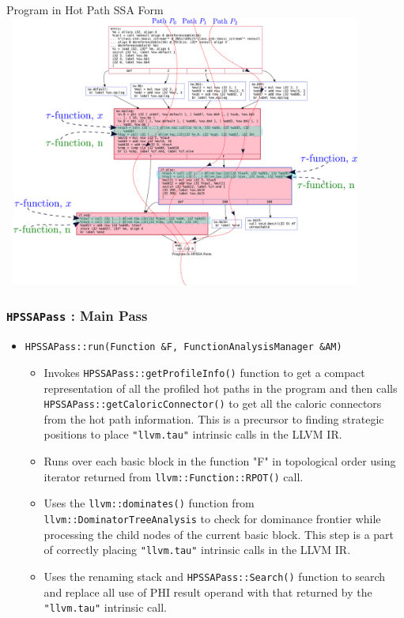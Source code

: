 \documentclass[aspectratio=169, compress]{beamer}
\begin{document}
\begin{frame}{Program in Hot Path SSA Form}
	\centering
	\includegraphics[width=12cm, height=8.95cm]{dotfiles/afterHPSSA.dot.pdf}
\end{frame}

\begin{frame}
	\frametitle{\texttt{HPSSAPass} : Main Pass}
	\begin{itemize}
		\item \texttt{HPSSAPass::run(Function &F, FunctionAnalysisManager &AM)} 
		\begin{itemize}
			\footnotesize
			\item Invokes \texttt{HPSSAPass::getProfileInfo()} function to get a compact representation of all the profiled \color{red} hot paths \color{black} in the program and then calls \texttt{HPSSAPass::getCaloricConnector()} to get all the caloric connectors from the \color{red} hot path \color{black} information. This is a precursor to finding strategic positions to place \texttt{"llvm.tau"} intrinsic calls in the LLVM IR. \pause
			\item Runs over each basic block in the function "F" in topological order using iterator returned from \texttt{llvm::Function::RPOT()} call.
			\item Uses the \texttt{llvm::dominates()} function from \texttt{llvm::DominatorTreeAnalysis} to check for dominance frontier while processing the child nodes of the current basic block. This step is a part of correctly placing \texttt{"llvm.tau"} intrinsic calls in the LLVM IR. \pause
			\item Uses the renaming stack and \texttt{HPSSAPass::Search()} function to search and replace all use of PHI result operand with that returned by the \texttt{"llvm.tau"} intrinsic call.
		\end{itemize}
	\end{itemize}
\end{frame}
\end{document}
